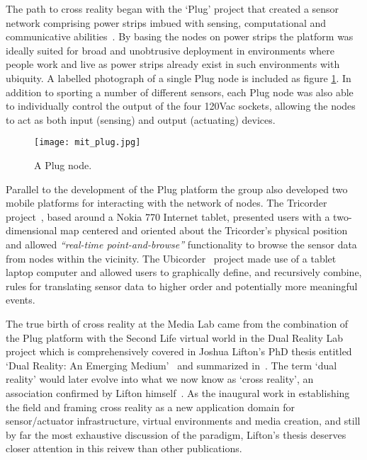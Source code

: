 The path to cross reality began with the `Plug' project that created a sensor network comprising power strips imbued with sensing, computational and communicative abilities~\cite{Lifton2007b}. By basing the nodes on power strips the platform was ideally suited for broad and unobtrusive deployment in environments where people work and live as power strips already exist in such environments with ubiquity. A labelled photograph of a single Plug node is included as figure \ref{mit_plug.jpg}. In addition to sporting a number of different sensors, each Plug node was also able to individually control the output of the four 120Vac sockets, allowing the nodes to act as both input (sensing) and output (actuating) devices.

\begin{figure}[h]
\centering
\texttt{[image: mit\_plug.jpg]}
\caption{A Plug node.}
\label{mit_plug.jpg}
\end{figure}

Parallel to the development of the Plug platform the group also developed two mobile platforms for interacting with the network of nodes. The Tricorder project~\cite{Lifton2007}, based around a Nokia 770 Internet tablet, presented users with a two-dimensional map centered and oriented about the Tricorder's physical position and allowed \textit{``real-time point-and-browse''} functionality to browse the sensor data from nodes within the vicinity. The Ubicorder~\cite{Mittal2011} project made use of a tablet laptop computer and allowed users to graphically define, and recursively combine, rules for translating sensor data to higher order and potentially more meaningful events.

The true birth of cross reality at the Media Lab came from the combination of the Plug platform with the Second Life virtual world in the Dual Reality Lab project which is comprehensively covered in Joshua Lifton's PhD thesis entitled `Dual Reality: An Emerging Medium'~\cite{Lifton2007a} and summarized in~\cite{lifton:merging}. The term `dual reality' would later evolve into what we now know as `cross reality', an association confirmed by Lifton himself~\cite{lifton:adoption}. As the inaugural work in establishing the field and framing cross reality as a new application domain for sensor/actuator infrastructure, virtual environments and media creation, and still by far the most exhaustive discussion of the paradigm, Lifton's thesis deserves closer attention in this reivew than other publications.

